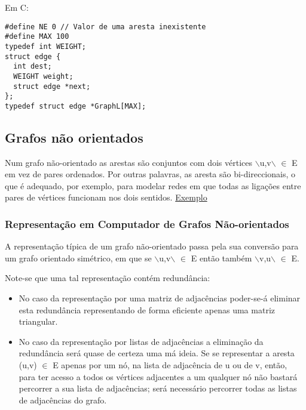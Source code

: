 \documentclass[11pt]{article}
\begin{document}
Em C:
\begin{verbatim}
#define NE 0 // Valor de uma aresta inexistente
#define MAX 100
typedef int WEIGHT;
struct edge {
  int dest;
  WEIGHT weight;
  struct edge *next;
};
typedef struct edge *GraphL[MAX];
\end{verbatim}

\subsection{Grafos não orientados}
\label{sec:orgd30558a}
Num grafo não-orientado as arestas são conjuntos com dois vértices $\backslash${u,v$\backslash$} \(\in\) E em vez de pares ordenados. Por outras palavras, as aresta são bi-direccionais, o que é adequado, por exemplo, para modelar redes em que todas as ligações entre pares de vértices funcionam nos dois sentidos.
\href{./nao\_orientado\_grafo.png}{Exemplo}

\subsubsection{Representação em Computador de Grafos Não-orientados}
\label{sec:org7eea082}
A representação típica de um grafo não-orientado passa pela sua conversão para um grafo orientado simétrico, em que se $\backslash${u,v$\backslash$} \(\in\) E então também $\backslash${v,u$\backslash$} \(\in\) E.

Note-se que uma tal representação contém redundância:


\begin{itemize}
\item No caso da representação por uma matriz de adjacências poder-se-á eliminar esta redundância representando de forma eficiente apenas uma matriz triangular.
\end{itemize}


\begin{itemize}
\item No caso da representação por listas de adjacências a eliminação da redundância será quase de certeza uma má ideia. Se se representar a aresta (u,v) \(\in\) E apenas por um nó, na lista de adjacência de u ou de v, então, para ter acesso a todos os vértices adjacentes a um qualquer nó não bastará percorrer a sua lista de adjacências; será necessário percorrer todas as listas de adjacências do grafo.
\end{itemize}
\end{document}
